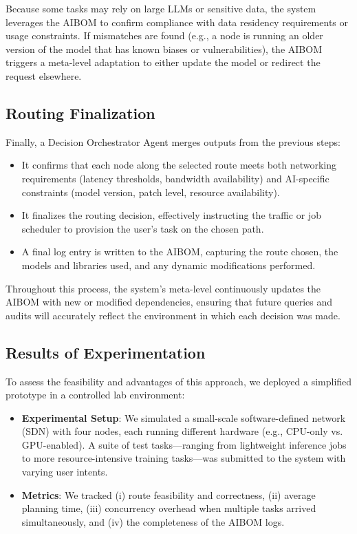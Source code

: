 Because some tasks may rely on large LLMs or sensitive data, the system leverages the AIBOM to confirm compliance with data residency requirements or usage constraints. If mismatches are found (e.g., a node is running an older version of the model that has known biases or vulnerabilities), the AIBOM triggers a meta-level adaptation to either update the model or redirect the request elsewhere.

\subsection{Routing Finalization}

Finally, a Decision Orchestrator Agent merges outputs from the previous steps:
\begin{itemize}[leftmargin=*, label=--]
    \item It confirms that each node along the selected route meets both networking requirements (latency thresholds, bandwidth availability) and AI-specific constraints (model version, patch level, resource availability).
    \item It finalizes the routing decision, effectively instructing the traffic or job scheduler to provision the user’s task on the chosen path.
    \item A final log entry is written to the AIBOM, capturing the route chosen, the models and libraries used, and any dynamic modifications performed.
\end{itemize}

Throughout this process, the system’s meta-level continuously updates the AIBOM with new or modified dependencies, ensuring that future queries and audits will accurately reflect the environment in which each decision was made.

\subsection{Results of Experimentation} \label{sec:results}

To assess the feasibility and advantages of this approach, we deployed a simplified prototype in a controlled lab environment:
\begin{itemize}[leftmargin=*, label=--]
    \item \textbf{Experimental Setup}: We simulated a small-scale software-defined network (SDN) with four nodes, each running different hardware (e.g., CPU-only vs. GPU-enabled). A suite of test tasks---ranging from lightweight inference jobs to more resource-intensive training tasks---was submitted to the system with varying user intents.
    \item \textbf{Metrics}: We tracked (i) route feasibility and correctness, (ii) average planning time, (iii) concurrency overhead when multiple tasks arrived simultaneously, and (iv) the completeness of the AIBOM logs.
\end{itemize}


